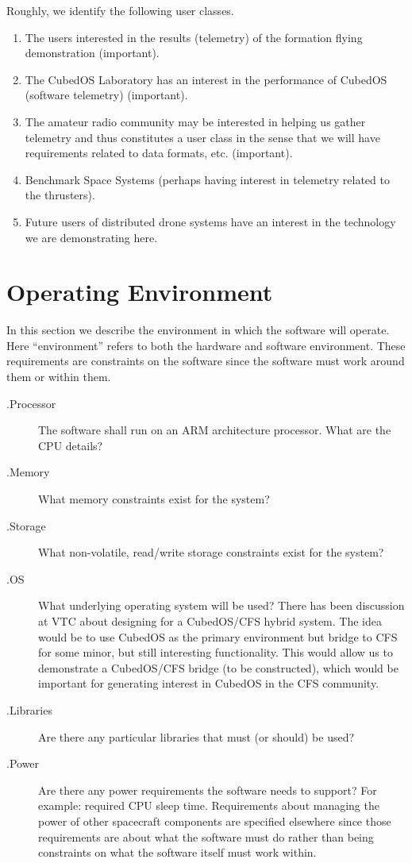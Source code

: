 Roughly, we identify the following user classes.
\begin{enumerate}
\item The users interested in the results (telemetry) of the formation flying demonstration (important).
\item The CubedOS Laboratory has an interest in the performance of CubedOS (software telemetry) (important).
\item The amateur radio community may be interested in helping us gather telemetry and thus constitutes a user class in the sense that we will have requirements related to data formats, etc. (important).
\item Benchmark Space Systems (perhaps having interest in telemetry related to the thrusters).
\item Future users of distributed drone systems have an interest in the technology we are demonstrating here.
\end{enumerate}

\section{Operating Environment}
In this section we describe the environment in which the software will operate. Here ``environment'' refers to both the hardware and software environment. These requirements are constraints on the software since the software must work around them or within them.

\begin{description}
\item[{\varenv}.Processor] The software shall run on an ARM architecture processor.  What are the CPU details?
\item[{\varenv}.Memory] What memory constraints exist for the system?
\item[{\varenv}.Storage] What non-volatile, read/write storage constraints exist for the system?
\item[{\varenv}.OS] What underlying operating system will be used? There has been discussion at VTC about designing for a CubedOS/CFS hybrid system. The idea would be to use CubedOS as the primary environment but bridge to CFS for some minor, but still interesting functionality. This would allow us to demonstrate a CubedOS/CFS bridge (to be constructed), which would be important for generating interest in CubedOS in the CFS community. \item[{\varenv}.Libraries] Are there any particular libraries that must (or should) be used?
\item[{\varenv}.Power] Are there any power requirements the software needs to support? For example: required CPU sleep time. Requirements about managing the power of other spacecraft components are specified elsewhere since those requirements are about what the software must do rather than being constraints on what the software itself must work within.
\end{description}

